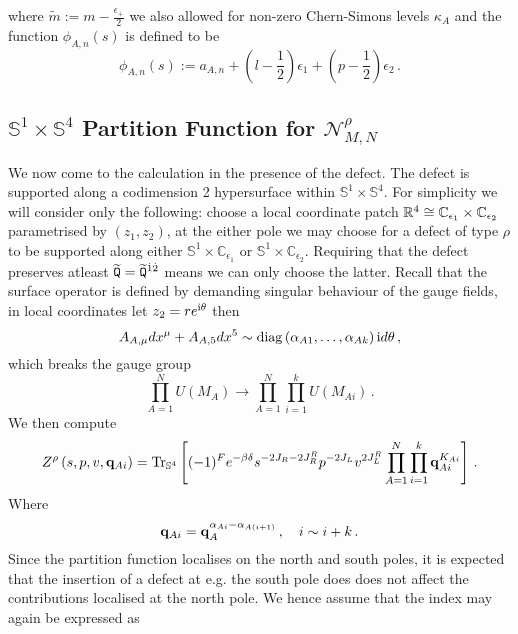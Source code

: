 \documentclass[main.tex]{subfiles}
\begin{document}
where $\tilde{m}:=m-\frac{\epsilon_+}{2}$ we also allowed for non-zero Chern-Simons levels $\kappa_A$ and the function $\phi_{A,n}(s)$ is defined to be
\begin{equation}
\phi_{A,n}(s):=a_{A,n}+\left(l-\frac{1}{2}\right)\epsilon_1+\left(p-\frac{1}{2}\right)\epsilon_2\,.
\end{equation} 

\subsection{\texorpdfstring{$\mathbb{S}^1\times \mathbb{S}^4$}{S1 x S4} Partition Function for \texorpdfstring{$\mathcal{N}^{\rho}_{M,N}$}{Nr(M,N)}}
We now come to the calculation in the presence of the defect. The defect is supported along a codimension 2 hypersurface within $\mathbb{S}^1\times \mathbb{S}^4$. For simplicity we will consider only the following: choose a local coordinate patch $\mathbb{R}^4\cong\mathbb{C}_{\epsilon_1}\times\mathbb{C}_{\epsilon_2}$ parametrised by $(z_1,z_2)$, at the either pole we may choose for a defect of type $\rho$ to be supported along either $\mathbb{S}^1\times\mathbb{C}_{\epsilon_1}$ or $\mathbb{S}^1\times\mathbb{C}_{\epsilon_2}$. Requiring that the defect preserves atleast $\widetilde{\mathtt{Q}}=\widetilde{\mathtt{Q}}^{\dot1\dot2}$ means we can only choose the latter. Recall that the surface operator is defined by demanding singular behaviour of the gauge fields, in local coordinates let $z_2=re^{\mathrm{i}\theta}$ then
\begin{equation}
A_{A,\mu}dx^{\mu}+A_{A,5}dx^5\sim\operatorname{diag}\left(\alpha_{A1},\dots,\alpha_{Ak}\right)\mathrm{i} d\theta\,,
\end{equation}
which breaks the gauge group
\begin{equation}
\prod_{A=1}^NU(M_{A})\to\prod_{A=1}^N\prod_{i=1}^kU(M_{Ai})\,.
\end{equation}
We then compute
\begin{equation}\label{eqn:5dindexdefect}
Z^{\rho}\left(s,p,v,\mathbf{q}_{Ai}\right)=\operatorname{Tr}_{\mathbb{S}^4}\left[(-1)^Fe^{-\beta\delta}s^{-2J_R-2J_R^R}p^{-2J_L}v^{2J_L^R}\prod_{A=1}^N\prod_{i=1}^k\mathbf{q}_{Ai}^{K_{Ai}}\right]\,.
\end{equation} 
Where 
\begin{equation}
\mathbf{q}_{Ai}=\mathbf{q}^{\alpha_{Ai}-\alpha_{A(i+1)}}_A\,,\quad i\sim i+k\,. 
\end{equation}
Since the partition function localises on the north and south poles, it is expected that the insertion of a defect at e.g. the south pole does does not affect the contributions localised at the north pole. We hence assume that the index may again be expressed as
\end{document}

